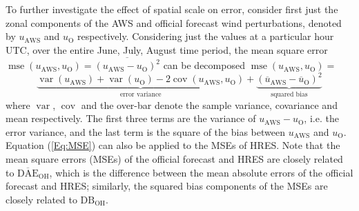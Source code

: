 \documentclass[twocol]{ametsoc}
\DeclareMathOperator{\mse}{mse}
\DeclareMathOperator{\cov}{cov}
\DeclareMathOperator{\var}{var}
\begin{document}
To further investigate the effect of spatial scale on error, consider first just the zonal components of the AWS and official forecast wind perturbations, denoted by $u_\text{AWS}$ and $u_\text{O}$ respectively. Considering just the values at a particular hour UTC, over the entire June, July, August time period, the mean square error $\mse\left(u_\text{AWS}, u_\text{O}\right) = \overline{\left(u_\text{AWS} - u_\text{O}\right)^2}$ can be decomposed $\mse\left(u_\text{AWS}, u_\text{O}\right)=$ 
\begin{equation}
\underbrace{\var\left(u_\text{AWS}\right) + \var\left(u_\text{O}\right) - 2\cov\left(u_\text{AWS}, u_\text{O}\right)}_\text{error variance} + \underbrace{\left(\overline{u}_\text{AWS} - \overline{u}_\text{O}\right)^2}_{\text{squared bias}} \label{Eq:MSE}
\end{equation}
where $\var$, $\cov$ and the over-bar denote the sample variance, covariance and mean respectively. The first three terms are the variance of $u_\text{AWS} - u_\text{O}$, i.e. the error variance, and the last term is the square of the bias between $u_\text{AWS}$ and $u_\text{O}$. Equation (\ref{Eq:MSE}) can also be applied to the MSEs of HRES. Note that the mean square errors (MSEs) of the official forecast and HRES are closely related to $\overline{\text{DAE}}_\text{OH}$, which is the difference between the mean absolute errors of the official forecast and HRES; similarly, the squared bias components of the MSEs are closely related to $\text{DB}_\text{OH}$. 
\end{document}
